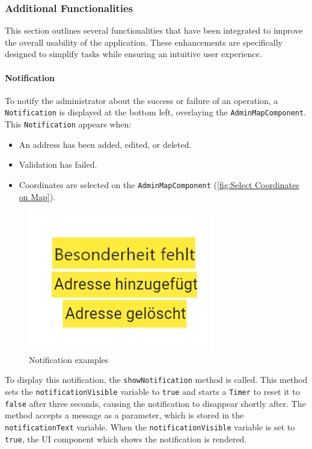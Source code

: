 \newpage


\subsubsection{Additional Functionalities}
    This section outlines several functionalities that have been integrated to improve the overall usability of the application. These enhancements are specifically designed to simplify tasks while ensuring an intuitive user experience.

\paragraph{Notification}
\label{fig:Notification}

    To notify the administrator about the success or failure of an operation, a \texttt{Notification} is displayed at the bottom left, overlaying the \texttt{AdminMapComponent}. This \texttt{Notification} appears when:

    \begin{itemize}
        \item An address has been added, edited, or deleted.
        \item Validation has failed.
        \item Coordinates are selected on the \texttt{AdminMapComponent} (\ref{fig:Select Coordinates on Map}).
    \end{itemize}


\begin{figure}[H]
    \centering
    \includegraphics[width=0.4\linewidth]{images/AdminPanel/NotificationExamples.png}
    \caption{Notification examples}
\end{figure}

To display this notification, the \texttt{showNotification} method is called. This method sets the \texttt{notificationVisible} variable to \texttt{true} and starts a \texttt{Timer} to reset it to \texttt{false} after three seconds, causing the notification to disappear shortly after. The method accepts a message as a parameter, which is stored in the \texttt{notificationText} variable. When the \texttt{notificationVisible} variable is set to \texttt{true}, the UI component which shows the notification is rendered.


